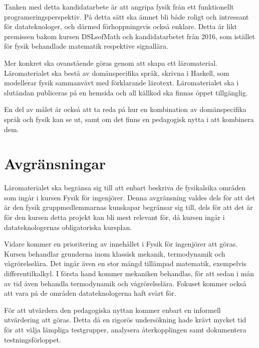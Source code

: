 \begin{draft}

Tanken med detta kandidatarbete är att angripa fysik från ett funktionellt programeringsperspektiv. På detta sätt ska ämnet bli både roligt och intressant för datateknologer, och därmed förhoppningsvis också enklare. Detta är likt premissen bakom kursen DSLsofMath och kandidatarbetet från 2016, som istället för fysik behandlade matematik respektive signallära.

Mer konkret ska ovanstående göras genom att skapa ett läromaterial. Läromaterialet ska bestå av domänspecifika språk, skrivna i Haskell, som modellerar fysik sammanvävt med förklarande lärotext. Läromaterialet ska i slutändan publiceras på en hemsida och all källkod ska finnas öppet tillgänglig.

En del av målet är också att ta reda på hur en kombination av domänspecifika språk och fysik kan se ut, samt om det finns en pedagogisk nytta i att kombinera dem.

\end{draft}

\section{Avgränsningar}

\begin{draft}

Läromaterialet ska begränsa sig till att enbart beskriva de fysikalsika områden som ingår i kursen Fysik för ingenjörer. Denna avgränsning valdes dels för att det är den fysik gruppmedlemmarnas kunskapar begränsar sig till, dels för att det är för den kursen detta projekt kan bli mest relevant för, då kursen ingår i datateknologernas obligatoriska kursplan.

Vidare kommer en prioritering av innehållet i Fysik för ingenjörer att göras. Kursen behandlar grunderna inom klassisk mekanik, termodynamik och vågrörelselära. Det ingår även en stor mängd tillämpad matematik, exempelvis differentilkalkyl. I första hand kommer mekaniken behandlas, för att sedan i mån av tid även behandla termodynamik och vågrörelselära. Fokuset kommer också att vara på de områden datateknologerna haft svårt för.

För att utvärdera den pedagogiska nyttan kommer enbart en informell utvärdering att göras. Detta då en rigorös undersökning hade krävt mycket tid för att välja lämpliga testgrupper, analysera återkopplingen samt dokumentera testningsförloppet.

\end{draft}
